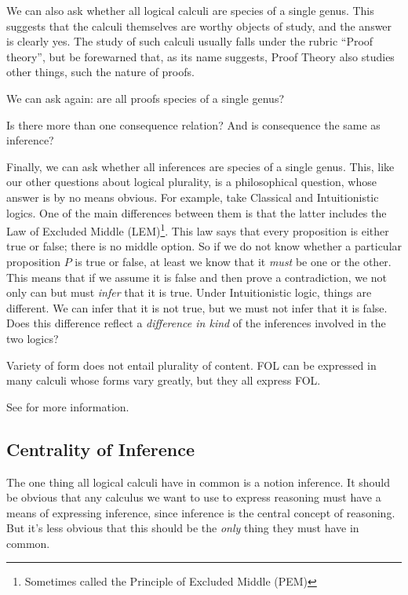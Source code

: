 \documentclass{article}
\begin{document}
We can also ask whether all logical calculi are species of a single
genus. This suggests that the calculi themselves are worthy objects of
study, and the answer is clearly yes. The study of such calculi
usually falls under the rubric ``Proof theory'', but be forewarned
that, as its name suggests, Proof Theory also studies other things,
such the nature of proofs.

We can ask again: are all proofs species of a single genus?

Is there more than one consequence relation? And is consequence the
same as inference?

Finally, we can ask whether all inferences are species of a single
genus. This, like our other questions about logical plurality, is a
philosophical question, whose answer is by no means obvious. For
example, take Classical and Intuitionistic logics. One of the main
differences between them is that the latter includes the Law of
Excluded Middle (LEM)\footnote{Sometimes called the Principle of
Excluded Middle (PEM)}. This law says that every proposition is either
true or false; there is no middle option. So if we do not know whether
a particular proposition \(P\) is true or false, at least we know that
it \textit{must} be one or the other. This means that if we assume it
is false and then prove a contradiction, we not only can but must
\textit{infer} that it is true. Under Intuitionistic logic, things are
different. We can infer that it is not true, but we must not infer
that it is false. Does this difference reflect a \textit{difference in
  kind} of the inferences involved in the two logics?

Variety of form does not entail plurality of content. FOL can be
expressed in many calculi whose forms vary greatly, but they all
express FOL.

See  \parencite{sep-logical-pluralism}
for more information.


\subsection{Centrality of Inference}

The one thing all logical calculi have in common is a notion
inference. It should be obvious that any calculus we want to use to
express reasoning must have a means of expressing inference, since
inference is the central concept of reasoning. But it's less obvious
that this should be the \textit{only} thing they must have in common.
\end{document}

